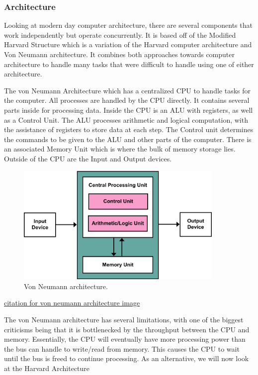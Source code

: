 \subsubsection{Architecture}\label{subsubsec:Arch}

Looking at modern day computer architecture, there are several components that work independently but operate concurrently.
It is based off of the Modified Harvard Structure which is a variation of the Harvard computer architecture and Von Neumann architecture.
It combines both approaches towards computer architecture to handle many tasks that were difficult to handle using one of either architecture.

The von Neumann Architecture which has a centralized CPU to handle tasks for the computer.
All processes are handled by the CPU directly.
It contains several parts inside for processing data.
Inside the CPU is an ALU with registers, as well as a Control Unit.
The ALU processes arithmetic and logical computation, with the assistance of registers to store data at each step.
The Control unit determines the commands to be given to the ALU and other parts of the computer.
There is an associated Memory Unit which is where the bulk of memory storage lies.
Outside of the CPU are the Input and Output devices.

\begin{figure}[htb]
    \centering
    \includegraphics[width=10cm]{Images/Von_Neumann_Architecture.png}
       \caption{Von Neumann architecture.}
           \label{Fig:VonNeumannArch}
\end{figure}

\href{https://commons.wikimedia.org/wiki/File:Von_Neumann_Architecture.svg}{citation for von neumann architecture image}

The von Neumann architecture has several limitations, with one of the biggest criticisms being that it is bottlenecked by the throughput between the CPU and memory.
Essentially, the CPU will eventually have more processing power than the bus can handle to write/read from memory.
This causes the CPU to wait until the bus is freed to continue processing.
As an alternative, we will now look at the Harvard Architecture

